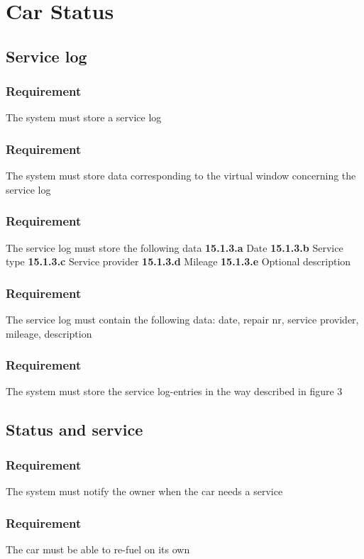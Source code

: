 \documentclass{article}
\begin{document}
{\section{Car Status}
  \subsection{Service log}
      \subsubsection{Requirement}
\hfill \break 
\- \- \-The system must store a service log
      \subsubsection{Requirement}
\hfill \break 
\- \- \- The system must store data corresponding to the virtual window concerning the service log
      \subsubsection{Requirement}
\hfill \break 
\- \- \-The service log must store the following data
\hfill \break 
\indent
\textbf{15.1.3.a} Date
\hfill \break 
\indent
\textbf{15.1.3.b} Service type
\hfill \break 
\indent
\textbf{15.1.3.c} Service provider
\hfill \break 
\indent
\textbf{15.1.3.d} Mileage
\hfill \break 
\indent
\textbf{15.1.3.e} Optional description
      \subsubsection{Requirement}
\hfill \break 
\- \- \-The service log must contain the following data: date, repair nr, service provider, mileage, description
      \subsubsection{Requirement}
\hfill \break 
\- \- \-The system must store the service log-entries in the way described in figure 3
  \subsection{Status and service}
      \subsubsection{Requirement}
\hfill \break 
\- \- \-The system must notify the owner when the car needs a service
      \subsubsection{Requirement}
\hfill \break 
\- \- \-The car must be able to re-fuel on its own
}
\end{document}
